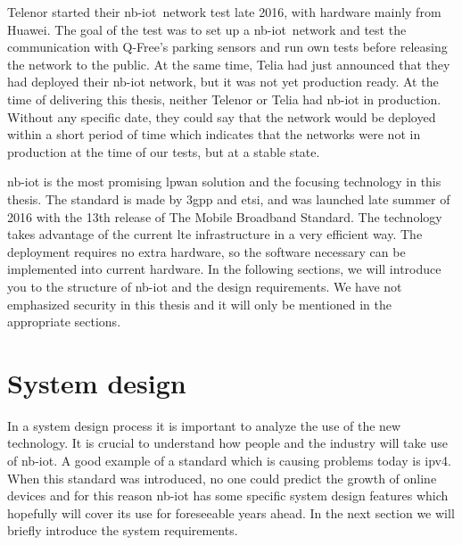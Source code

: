 \documentclass[USenglish]{ifimaster}  %
\begin{document}
Telenor started their \acrshort{nb-iot} network test late 2016, with hardware mainly from Huawei. The goal of the test was to set up a \acrshort{nb-iot} network and test the communication with Q-Free's parking sensors and run own tests before releasing the network to the public. At the same time, Telia had just announced that they had deployed their \acrshort{nb-iot} network, but it was not yet production ready. At the time of delivering this thesis, neither Telenor or Telia had \acrshort{nb-iot} in production. Without any specific date, they could say that the network would be deployed within a short period of time which indicates that the networks were not in production at the time of our tests, but at a stable state.

\acrshort{nb-iot} is the most promising \acrshort{lpwan} solution and the focusing technology in this thesis. The standard is made by \acrshort{3gpp} and \acrfull{etsi}, and was launched late summer of 2016 with the 13th release of The Mobile Broadband Standard. The technology takes advantage of the current \acrshort{lte} infrastructure in a very efficient way. The deployment requires no extra hardware, so the software necessary can be implemented into current hardware. In the following sections, we will introduce you to the structure of \acrshort{nb-iot} and the design requirements. We have not emphasized security in this thesis and it will only be mentioned in the appropriate sections.

\section{System design}
In a system design process it is important to analyze the use of the new technology. It is crucial to understand how people and the industry will take use of \acrshort{nb-iot}. A good example of a standard which is causing problems today is \acrshort{ipv4}. When this standard was introduced, no one could predict the growth of online devices and for this reason \acrshort{nb-iot} has some specific system design features which hopefully will cover its use for foreseeable years ahead. In the next section we will briefly introduce the system requirements.
\end{document}
